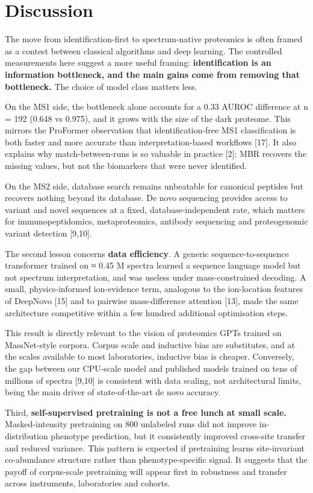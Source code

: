 \documentclass[
]{article}
\begin{document}
\hypertarget{discussion}{%
\section{Discussion}\label{discussion}}

The move from identification-first to spectrum-native proteomics is
often framed as a contest between classical algorithms and deep
learning. The controlled measurements here suggest a more useful
framing: \textbf{identification is an information bottleneck, and the
main gains come from removing that bottleneck.} The choice of model
class matters less.

On the MS1 side, the bottleneck alone accounts for a 0.33 AUROC
difference at n = 192 (0.648 vs 0.975), and it grows with the size of
the dark proteome. This mirrors the ProFormer observation that
identification-free MS1 classification is both faster and more accurate
than interpretation-based workflows {[}17{]}. It also explains why
match-between-runs is so valuable in practice {[}2{]}: MBR recovers the
missing values, but not the biomarkers that were never identified.

On the MS2 side, database search remains unbeatable for canonical
peptides but recovers nothing beyond its database. De novo sequencing
provides access to variant and novel sequences at a fixed,
database-independent rate, which matters for immunopeptidomics,
metaproteomics, antibody sequencing and proteogenomic variant detection
{[}9,10{]}.

The second lesson concerns \textbf{data efficiency}. A generic
sequence-to-sequence transformer trained on ≈ 0.45 M spectra learned a
sequence language model but not spectrum interpretation, and was useless
under mass-constrained decoding. A small, physics-informed ion-evidence
term, analogous to the ion-location features of DeepNovo {[}15{]} and to
pairwise mass-difference attention {[}13{]}, made the same architecture
competitive within a few hundred additional optimisation steps.

This result is directly relevant to the vision of proteomics GPTs
trained on MassNet-style corpora. Corpus scale and inductive bias are
substitutes, and at the scales available to most laboratories, inductive
bias is cheaper. Conversely, the gap between our CPU-scale model and
published models trained on tens of millions of spectra {[}9,10{]} is
consistent with data scaling, not architectural limits, being the main
driver of state-of-the-art de novo accuracy.

Third, \textbf{self-supervised pretraining is not a free lunch at small
scale.} Masked-intensity pretraining on 800 unlabeled runs did not
improve in-distribution phenotype prediction, but it consistently
improved cross-site transfer and reduced variance. This pattern is
expected if pretraining learns site-invariant co-abundance structure
rather than phenotype-specific signal. It suggests that the payoff of
corpus-scale pretraining will appear first in robustness and transfer
across instruments, laboratories and cohorts.
\end{document}
